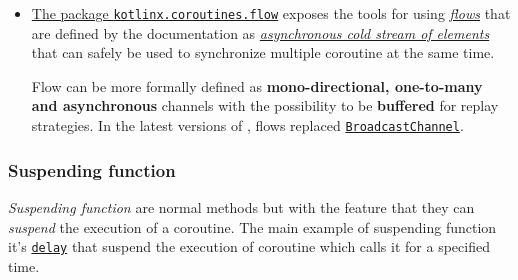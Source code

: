 \begin{itemize}
	Two coroutines can use a channel in order to transfer a single value that came from the \textit{producer} (the coroutine that invoke the \texttt{send} operation) and goes to the \textit{consumer} (the coroutine that invoke the \texttt{receive} operation); in \Kotlin channels are \textbf{bidirectional} and \textbf{symmetric} (one-to-one).
	
	\textbf{The semantic of \textit{send/receive} operations depends on the nature of the channel} that is determinated by its capacity, but the communication can be \textbf{synchronous} or \textbf{asynchronous} with also some little variations of these (for example, \textbf{rendez-vous}).
	Notice that a channel can safely be shared between coroutines, but the developer has to pay attention because the \texttt{receive} operation can easily lead to competition problems if invoked parallel from two or more coroutines.
	
	$\big[$See \href{https://github.com/LM-96/Activity-Project-Operating-Systems-M-/blob/main/code/kotlin/unibo.apos.examples/src/main/kotlin/unibo/apos/examples/ChannelPiCalculation.kt}{\texttt{ChannelPiCalculation.kt}} for a basic example$\big]$
	
	\item \underline{The package \href{https://kotlinlang.org/api/kotlinx.coroutines/kotlinx-coroutines-core/kotlinx.coroutines.flow/}{\texttt{kotlinx.coroutines.flow}}} exposes the tools for using \href{https://kotlinlang.org/docs/flow.html}{\textit{flows}} that are defined by the documentation as \href{https://kotlinlang.org/api/kotlinx.coroutines/kotlinx-coroutines-core/kotlinx.coroutines.flow/L}{\textit{asynchronous cold stream of elements}} that can safely be used to synchronize multiple coroutine at the same time.
	
	Flow can be more formally defined as \textbf{mono-directional, one-to-many and asynchronous} channels with the possibility to be \textbf{buffered} for replay strategies. In the latest versions of \Kotlin, flows replaced \href{https://kotlinlang.org/api/kotlinx.coroutines/kotlinx-coroutines-core/kotlinx.coroutines.channels/-broadcast-channel/}{\texttt{BroadcastChannel}}.
\end{itemize}

\subsubsection{Suspending function}

\textit{Suspending function} are normal \Kotlin methods but with the feature that they can \textit{suspend} the execution of a coroutine. The main example of suspending function it's \href{https://kotlinlang.org/api/kotlinx.coroutines/kotlinx-coroutines-core/kotlinx.coroutines/delay.html}{\texttt{delay}} that suspend the execution of coroutine which calls it for a specified time.

